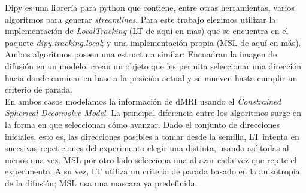 Dipy es una librer\'ia para python que contiene, entre otras herramientas,
varios algoritmos para generar \textit{streamlines}. Para este trabajo elegimos
utilizar la implementaci\'on de \textit{LocalTracking} (LT de aqu\'i en mas) que
se encuentra en el paquete \textit{dipy.tracking.local}; y una implementaci\'on 
propia (MSL de aqu\'i en m\'as). Ambos algoritmos poseen una estructura 
similar: Encuadran la imagen de difusi\'on en un modelo; crean un objeto que les
permita seleccionar una direcci\'on hacia donde caminar en base a la posici\'on
actual y se mueven hasta cumplir un criterio de parada.\\

En ambos casos modelamos la informaci\'on de dMRI usando el \textit{Constrained
Spherical Deconvolve Model}. La principal diferencia entre los algoritmos surge
en la forma en que seleccionan c\'omo avanzar. Dado el conjunto de direcciones 
iniciales, esto es, las direcciones posibles a tomar desde la semilla,
LT intenta en sucesivas repeticiones del experimento elegir una distinta, 
usando as\'i todas al menos una vez. MSL por otro lado selecciona una al
azar cada vez que repite el experimento. A su vez, LT utiliza un criterio de 
parada basado en la anisotrop\'ia de la difusi\'on; MSL usa una mascara ya 
predefinida. \\
